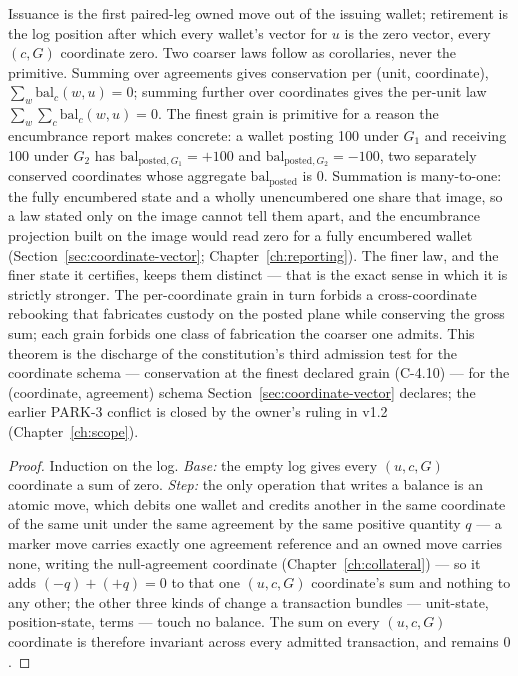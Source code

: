 Issuance is the first paired-leg owned move out of the issuing wallet; retirement is the
log position after which every wallet's vector for $u$ is the zero vector, every $(c,G)$
coordinate zero. Two coarser laws follow as corollaries, never the primitive. Summing over
agreements gives conservation per (unit, coordinate), $\sum_w \mathrm{bal}_c(w,u)=0$;
summing further over coordinates gives the per-unit law $\sum_w\sum_c \mathrm{bal}_c(w,u)=0$.
The finest grain is primitive for a reason the encumbrance report makes concrete: a wallet
posting 100 under $G_1$ and receiving 100 under $G_2$ has
$\mathrm{bal}_{\text{posted},G_1}=+100$ and $\mathrm{bal}_{\text{posted},G_2}=-100$, two
separately conserved coordinates whose aggregate $\mathrm{bal}_{\text{posted}}$ is $0$.
Summation is many-to-one: the fully encumbered state and a wholly unencumbered one share
that image, so a law stated only on the image cannot tell them apart, and the encumbrance
projection built on the image would read zero for a fully encumbered wallet
(Section~\ref{sec:coordinate-vector}; Chapter~\ref{ch:reporting}). The finer law,
and the finer state it certifies, keeps them distinct --- that is the exact sense in which
it is strictly stronger. The per-coordinate grain in turn forbids a cross-coordinate
rebooking that fabricates custody on the posted plane while conserving the gross sum; each
grain forbids one class of fabrication the coarser one admits. This theorem is the
discharge of the constitution's third admission test for the coordinate schema ---
conservation at the finest declared grain (C-4.10) --- for the (coordinate, agreement)
schema Section~\ref{sec:coordinate-vector} declares; the earlier PARK-3 conflict is
closed by the owner's ruling in v1.2 (Chapter~\ref{ch:scope}).

\begin{proof}
Induction on the log. \emph{Base:} the empty log gives every $(u,c,G)$ coordinate a sum of
zero. \emph{Step:} the only operation that writes a balance is an atomic move, which debits
one wallet and credits another in the same coordinate of the same unit under the same
agreement by the same positive quantity $q$ --- a marker move carries exactly one agreement
reference and an owned move carries none, writing the null-agreement coordinate
(Chapter~\ref{ch:collateral}) --- so it adds $(-q)+(+q)=0$ to that one $(u,c,G)$ coordinate's
sum and nothing to any other; the other three kinds of change a transaction bundles ---
unit-state, position-state, terms --- touch no balance. The sum on every $(u,c,G)$
coordinate is therefore invariant across every admitted transaction, and remains $0$.
\end{proof}

